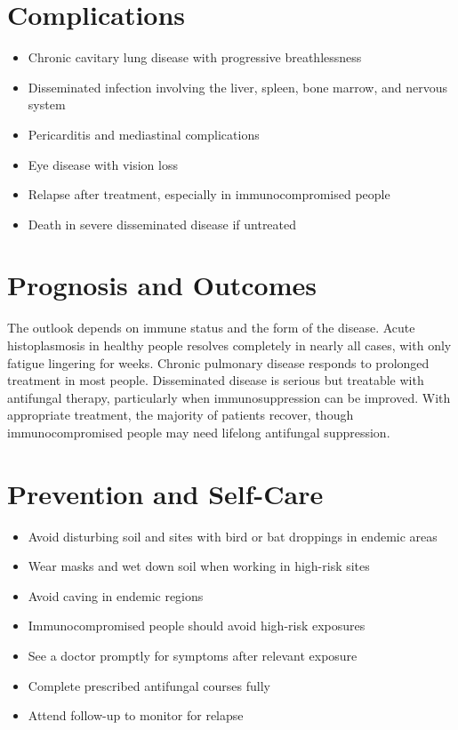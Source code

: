 \section*{Complications}
\begin{itemize}
    \item Chronic cavitary lung disease with progressive breathlessness
    \item Disseminated infection involving the liver, spleen, bone marrow, and nervous system
    \item Pericarditis and mediastinal complications
    \item Eye disease with vision loss
    \item Relapse after treatment, especially in immunocompromised people
    \item Death in severe disseminated disease if untreated
\end{itemize}

\section*{Prognosis and Outcomes}
The outlook depends on immune status and the form of the disease. Acute histoplasmosis in healthy people resolves completely in nearly all cases, with only fatigue lingering for weeks. Chronic pulmonary disease responds to prolonged treatment in most people. Disseminated disease is serious but treatable with antifungal therapy, particularly when immunosuppression can be improved. With appropriate treatment, the majority of patients recover, though immunocompromised people may need lifelong antifungal suppression.

\section*{Prevention and Self-Care}
\begin{itemize}
    \item Avoid disturbing soil and sites with bird or bat droppings in endemic areas
    \item Wear masks and wet down soil when working in high-risk sites
    \item Avoid caving in endemic regions
    \item Immunocompromised people should avoid high-risk exposures
    \item See a doctor promptly for symptoms after relevant exposure
    \item Complete prescribed antifungal courses fully
    \item Attend follow-up to monitor for relapse
\end{itemize}

